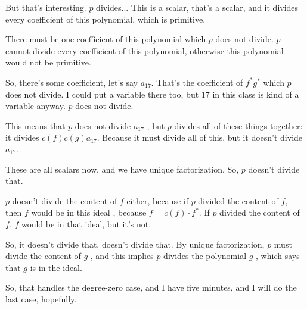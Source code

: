 \begin{proofWrapper}
\begin{speech}[00:34:58 - 00:36:57]
But that's interesting. $p$ divides... This is a scalar, that's a scalar, and it divides every coefficient of this polynomial, which is primitive.

There must be one coefficient of this polynomial which $p$ does not divide. $p$ cannot divide every coefficient of this polynomial, otherwise this polynomial would not be primitive.

So, there's some coefficient, let's say $a_{17}$. That's the coefficient  of $f^* g^*$  which $p$ does not divide.  I could put a variable there too, but $17$ in this class is kind of a variable anyway. $p$ does not divide.

This means that $p$ does not divide $a_{17}$ , but $p$ divides all of these things together: it divides $c(f) c(g) a_{17}$.  Because it must divide all of this, but it doesn't divide $a_{17}$.

These are all scalars now, and we have unique factorization. So, $p$ doesn't divide that.

$p$ doesn't divide the content of $f$ either, because if $p$ divided the content of $f$, then $f$ would be in this ideal , because $f = c(f) \cdot f^*$. If $p$ divided the content of $f$, $f$ would be in that ideal, but it's not.

So, it doesn't divide that, doesn't divide that. By unique factorization, $p$ must divide the content of $g$ , and this implies $p$ divides the polynomial $g$ , which says that $g$ is in the ideal. 

So, that handles the degree-zero case, and I have five minutes, and I will do the last case, hopefully.
\end{speech}


\end{proofWrapper}
